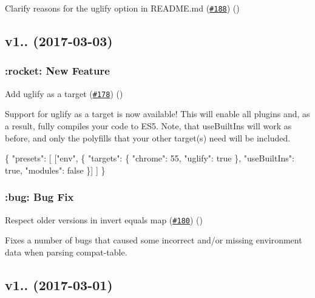 \begin{DoxyItemize}
\item Clarify reasons for the uglify option in R\+E\+A\+D\+M\+E.\+md (\href{https://github.com/babel/babel-preset-env/pull/188}{\tt \#188}) ()
\end{DoxyItemize}

\subsection*{v1.. (2017-\/03-\/03)}

\subsubsection*{\+:rocket\+: New Feature}


\begin{DoxyItemize}
\item Add uglify as a target (\href{https://github.com/babel/babel-preset-env/pull/178}{\tt \#178}) ()
\end{DoxyItemize}

Support for {\ttfamily uglify} as a target is now available! This will enable all plugins and, as a result, fully compiles your code to E\+S5. Note, that use\+Built\+Ins will work as before, and only the polyfills that your other target(s) need will be included.


\begin{DoxyCode}
\{
  "presets": [
    ["env", \{
      "targets": \{
        "chrome": 55,
        "uglify": true
      \},
      "useBuiltIns": true,
      "modules": false
    \}]
  ]
\}
\end{DoxyCode}


\subsubsection*{\+:bug\+: Bug Fix}


\begin{DoxyItemize}
\item Respect older versions in invert equals map (\href{https://github.com/babel/babel-preset-env/pull/180}{\tt \#180}) ()
\end{DoxyItemize}

Fixes a number of bugs that caused some incorrect and/or missing environment data when parsing {\ttfamily compat-\/table}.

\subsection*{v1.. (2017-\/03-\/01)}

